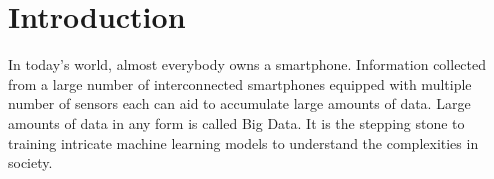 \chapter{Introduction}

In today's world, almost everybody owns a smartphone. Information collected from a large number of interconnected smartphones equipped with
multiple number of sensors each can aid to accumulate large amounts of data. Large amounts of data in any form is called Big Data. It
is the stepping stone to training intricate machine learning models to understand the complexities in society. 





